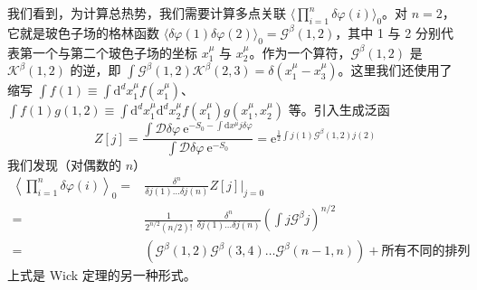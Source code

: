 我们看到，为计算总热势，我们需要计算多点关联 $\langle\prod_{i=1}^{n}\delta\varphi(i)\rangle_{0}$。对 $n=2$，它就是玻色子场的格林函数 $\langle\delta\varphi(1)\delta\varphi(2)\rangle_{0}=\mathcal{G}^{\beta}(1,2)$，其中 1 与 2 分别代表第一个与第二个玻色子场的坐标 $x_{1}^{\mu}$ 与 $x_{2}^{\mu}$。作为一个算符，$\mathcal{G}^{\beta}(1,2)$ 是 $\mathcal{K}^{\beta}(1,2)$ 的逆，即 $\int \mathcal{G}^{\beta}(1,2)\mathcal{K}^{\beta}(2,3)=\delta(x_{1}^{\mu}-x_{3}^{\mu})$。这里我们还使用了缩写 $\int f(1)\equiv\int \mathrm{d}^{d}x_{1}^{\mu}f(x_{1}^{\mu})$、$\int f(1)g(1,2)\equiv\int \mathrm{d}^{d}x_{1}^{\mu}\mathrm{d}^{d}x_{2}^{\mu}f(x_{1}^{\mu})g(x_{1}^{\mu},x_{2}^{\mu})$ 等。引入生成泛函
\begin{equation*}
Z[j] = \frac{\int\mathcal{D}\delta\varphi\ \mathrm{e}^{-S_{0}-\int \mathrm{d}x^{\mu}j\delta\varphi}}{\int\mathcal{D}\delta\varphi\ \mathrm{e}^{-S_{0}}} = \mathrm{e}^{\frac{1}{2}\int j(1)\mathcal{G}^{\beta}(1,2)j(2)}
\end{equation*}
我们发现（对偶数的 $n$）
\begin{align*}
\left\langle\prod_{i=1}^{n}\delta\varphi(i)\right\rangle_{0} ={}& \frac{\delta^{n}}{\delta j(1)\dots\delta j(n)}Z[j]\Big|_{j=0}\\
={}& \frac{1}{2^{n/2}(n/2)!}\ \frac{\delta^{n}}{\delta j(1)\dots\delta j(n)}\left(\int j\mathcal{G}^{\beta}j\right)^{n/2}\\
={}& \left(\mathcal{G}^{\beta}(1,2)\mathcal{G}^{\beta}(3,4)\dots\mathcal{G}^{\beta}(n-1,n)\right) + \text{所有不同的排列}
\end{align*}
上式是 Wick 定理的另一种形式。


